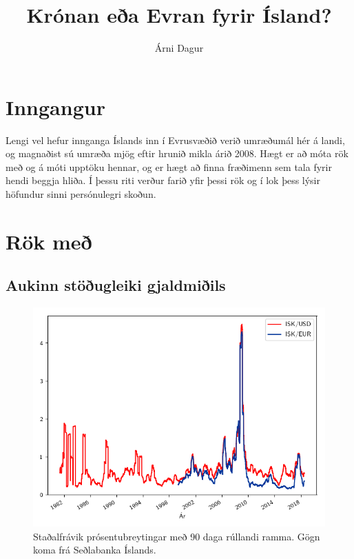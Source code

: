 \documentclass[a4paper]{article}
\title{Krónan eða Evran fyrir Ísland?}
\author{Árni Dagur}
\begin{document}
\maketitle

\section{Inngangur}

Lengi vel hefur innganga Íslands inn í Evrusvæðið verið umræðumál hér á landi, og magnaðist sú umræða mjög eftir hrunið mikla árið 2008. Hægt er að móta rök með og á móti upptöku hennar, og er hægt að finna fræðimenn sem tala fyrir hendi beggja hliða. Í þessu riti verður farið yfir þessi rök og í lok þess lýsir höfundur sinni persónulegri skoðun.


\section{Rök með}

\subsection{Aukinn stöðugleiki gjaldmiðils}
\begin{figure} %
    \centerline{\includegraphics{volatility.png}}
    \caption{Staðalfrávik prósentubreytingar með 90 daga rúllandi ramma. Gögn koma frá Seðlabanka Íslands.}
    \label{fig:volatility}
\end{figure} %
\end{document}
